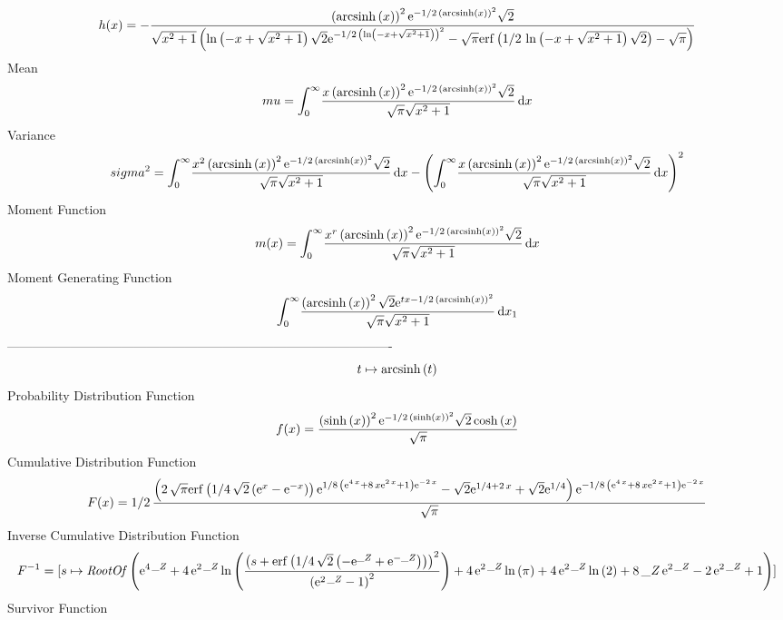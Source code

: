 \documentclass[12pt]{article}
\begin{document}
 $$ h(x)=-{\frac { \left( {\rm arcsinh} \left(x\right) \right) ^{2}{{\rm e}^{-1
/2\, \left( {\rm arcsinh} \left(x\right) \right) ^{2}}}\sqrt {2}}{
\sqrt {{x}^{2}+1} \left( \ln  \left( -x+\sqrt {{x}^{2}+1} \right) 
\sqrt {2}{{\rm e}^{-1/2\, \left( \ln  \left( -x+\sqrt {{x}^{2}+1}
 \right)  \right) ^{2}}}-\sqrt {\pi}{\rm erf} \left(1/2\,\ln  \left( -
x+\sqrt {{x}^{2}+1} \right) \sqrt {2}\right)-\sqrt {\pi} \right) }}
$$Mean 
 $$ mu=\int_{0}^{\infty }\!{\frac {x \left( {\rm arcsinh} \left(x\right)
 \right) ^{2}{{\rm e}^{-1/2\, \left( {\rm arcsinh} \left(x\right)
 \right) ^{2}}}\sqrt {2}}{\sqrt {\pi}\sqrt {{x}^{2}+1}}}\,{\rm d}x
$$ Variance 
 $$ sigma^2 = \int_{0}^{\infty }\!{\frac {{x}^{2} \left( {\rm arcsinh} \left(x
\right) \right) ^{2}{{\rm e}^{-1/2\, \left( {\rm arcsinh} \left(x
\right) \right) ^{2}}}\sqrt {2}}{\sqrt {\pi}\sqrt {{x}^{2}+1}}}
\,{\rm d}x- \left( \int_{0}^{\infty }\!{\frac {x \left( {\rm arcsinh} 
\left(x\right) \right) ^{2}{{\rm e}^{-1/2\, \left( {\rm arcsinh} 
\left(x\right) \right) ^{2}}}\sqrt {2}}{\sqrt {\pi}\sqrt {{x}^{2}+1}}}
\,{\rm d}x \right) ^{2}
$$Moment Function 
 $$ m(x) = \int_{0}^{\infty }\!{\frac {{x}^{r} \left( {\rm arcsinh} \left(x
\right) \right) ^{2}{{\rm e}^{-1/2\, \left( {\rm arcsinh} \left(x
\right) \right) ^{2}}}\sqrt {2}}{\sqrt {\pi}\sqrt {{x}^{2}+1}}}
\,{\rm d}x
$$ Moment Generating Function 
 $$\int_{0}^{\infty }\!{\frac { \left( {\rm arcsinh} \left(x\right)
 \right) ^{2}\sqrt {2}{{\rm e}^{tx-1/2\, \left( {\rm arcsinh} \left(x
\right) \right) ^{2}}}}{\sqrt {\pi}\sqrt {{x}^{2}+1}}}\,{\rm d}x_{{1}}
$$-------------------------------------------------------------------------------------------  \\$$t\mapsto {\rm arcsinh} \left(t\right)
$$Probability Distribution Function 
$$  f(x)={\frac { \left( \sinh \left( x \right)  \right) ^{2}{{\rm e}^{-1/2\,
 \left( \sinh \left( x \right)  \right) ^{2}}}\sqrt {2}\cosh \left( x
 \right) }{\sqrt {\pi}}}
$$Cumulative Distribution Function  
 $$F(x)=1/2\,{\frac { \left( 2\,\sqrt {\pi}{\rm erf} \left(1/4\,\sqrt {2}
 \left( {{\rm e}^{x}}-{{\rm e}^{-x}} \right) \right){{\rm e}^{1/8\,
 \left( {{\rm e}^{4\,x}}+8\,x{{\rm e}^{2\,x}}+1 \right) {{\rm e}^{-2\,
x}}}}-\sqrt {2}{{\rm e}^{1/4+2\,x}}+\sqrt {2}{{\rm e}^{1/4}} \right) {
{\rm e}^{-1/8\, \left( {{\rm e}^{4\,x}}+8\,x{{\rm e}^{2\,x}}+1
 \right) {{\rm e}^{-2\,x}}}}}{\sqrt {\pi}}}
$$ Inverse Cumulative Distribution Function 
  $$F^{-1} = [s\mapsto {\it RootOf} \left( {{\rm e}^{4\,{\it \_Z}}}+4\,{{\rm e}^{2
\,{\it \_Z}}}\ln  \left( {\frac { \left( s+{\rm erf} \left(1/4\,\sqrt 
{2} \left( -{{\rm e}^{{\it \_Z}}}+{{\rm e}^{-{\it \_Z}}} \right) 
\right) \right) ^{2}}{ \left( {{\rm e}^{2\,{\it \_Z}}}-1 \right) ^{2}}
} \right) +4\,{{\rm e}^{2\,{\it \_Z}}}\ln  \left( \pi \right) +4\,{
{\rm e}^{2\,{\it \_Z}}}\ln  \left( 2 \right) +8\,{\it \_Z}\,{{\rm e}^{
2\,{\it \_Z}}}-2\,{{\rm e}^{2\,{\it \_Z}}}+1 \right) ]
$$Survivor Function 
\end{document}
